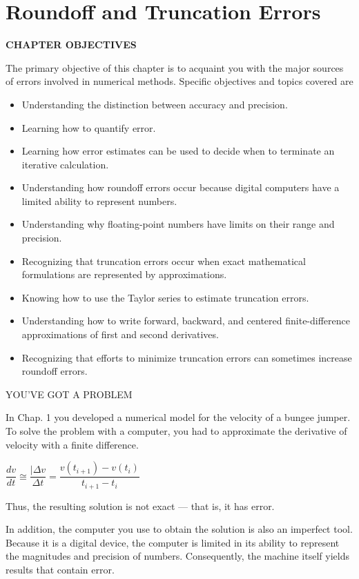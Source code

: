 \documentclass[../main.tex]{subfiles}
\begin{document}
\chapter{Roundoff and Truncation Errors}
\label{chap:chap_4}

\begin{center}
\Large{\textbf{CHAPTER OBJECTIVES}}    
\end{center}
The primary objective of this chapter is to acquaint you with the major sources of
errors involved in numerical methods. Specific objectives and topics covered are
\begin{itemize}
\item Understanding the distinction between accuracy and precision.
\item Learning how to quantify error.
\item Learning how error estimates can be used to decide when to terminate an iterative
calculation.
\item Understanding how roundoff errors occur because digital computers have a
limited ability to represent numbers.
\item Understanding why floating-point numbers have limits on their range and
precision.
\item Recognizing that truncation errors occur when exact mathematical formulations
are represented by approximations.
\item Knowing how to use the Taylor series to estimate truncation errors.
\item Understanding how to write forward, backward, and centered finite-difference
approximations of first and second derivatives.
\item Recognizing that efforts to minimize truncation errors can sometimes increase
roundoff errors.
\end{itemize}

\bigskip
\noindent
\Large{YOU'VE GOT A PROBLEM}
\bigskip

\noindent
\normalsize{In Chap. 1 you developed a numerical model for the velocity of a bungee jumper. To
solve the problem with a computer, you had to approximate the derivative of velocity
with a finite difference.}

\bigskip
$\dfrac{dv}{dt}\cong\dfrac{\mid\Delta v}{\Delta t}=
\dfrac{v(t_{i+1})-v(t_i)}{t_{i+1}-t_i}$

\bigskip
\noindent
Thus, the resulting solution is not exact --- that is, it has error.

In addition, the computer you use to obtain the solution is also an imperfect tool. Because
it is a digital device, the computer is limited in its ability to represent the magnitudes
and precision of numbers. Consequently, the machine itself yields results that contain error.
\end{document}
